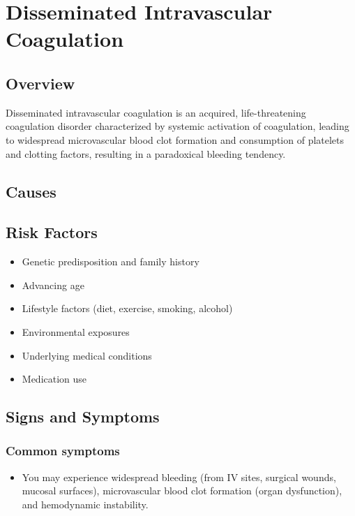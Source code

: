 \chapter{Disseminated Intravascular Coagulation}
\label{sec:Disseminated Intravascular Coagulation}

\section{Overview}
Disseminated intravascular coagulation is an acquired, life-threatening coagulation disorder characterized by systemic activation of coagulation, leading to widespread microvascular blood clot formation and consumption of platelets and clotting factors, resulting in a paradoxical bleeding tendency.
\section{Causes}
\section{Risk Factors}

\begin{itemize}[noitemsep]
  \item Genetic predisposition and family history
  \item Advancing age
  \item Lifestyle factors (diet, exercise, smoking, alcohol)
  \item Environmental exposures
  \item Underlying medical conditions
  \item Medication use
\end{itemize}
\section{Signs and Symptoms}

\subsection{Common symptoms}
\begin{itemize}[noitemsep]
  \item You may experience widespread bleeding (from IV sites, surgical wounds, mucosal surfaces), microvascular blood clot formation (organ dysfunction), and hemodynamic instability. 
  \end{itemize}

